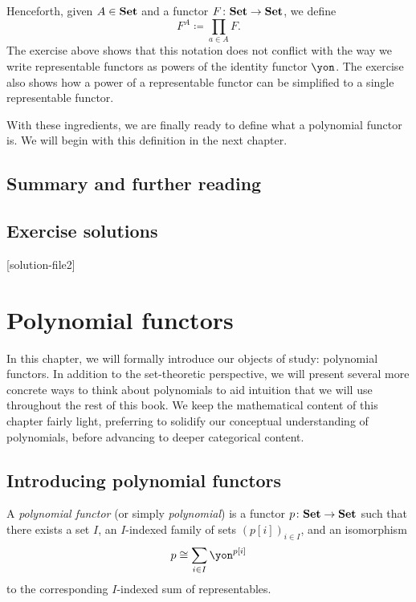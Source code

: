 \documentclass[Book-Poly]{subfiles}
\begin{document}
Henceforth, given $A\in\mathbf{Set}$ and a functor $F\colon\mathbf{Set}\to\mathbf{Set}$, we define
\[
F^A\coloneqq\prod_{a\in A}F.
\]
The exercise above shows that this notation does not conflict with the way we write representable functors as powers of the identity functor $\yon$.
The exercise also shows how a power of a representable functor can be simplified to a single representable functor.

With these ingredients, we are finally ready to define what a polynomial functor is.
We will begin with this definition in the next chapter.

\section{Summary and further reading}


\section{Exercise solutions}
{\footnotesize
    }

[solution-file2]

\chapter{Polynomial functors} \label{ch.poly.obj}

In this chapter, we will formally introduce our objects of study: polynomial functors.
In addition to the set-theoretic perspective, we will present several more concrete ways to think about polynomials to aid intuition that we will use throughout the rest of this book.
We keep the mathematical content of this chapter fairly light, preferring to solidify our conceptual understanding of polynomials, before advancing to deeper categorical content.

\section{Introducing polynomial functors} \label{sec.poly.obj.intro}

\begin{definition}
    A \emph{polynomial functor} (or simply \emph{polynomial}) is a functor $p\colon\mathbf{Set}\to\mathbf{Set}$ such that there exists a set $I$, an $I$-indexed family of sets $(p[i])_{i\in I}$, and an isomorphism
    \[
    p\iso\sum_{i\in I}\yon^{p[i]}
    \]
    to the corresponding $I$-indexed sum of representables.
\end{definition}
\end{document}
